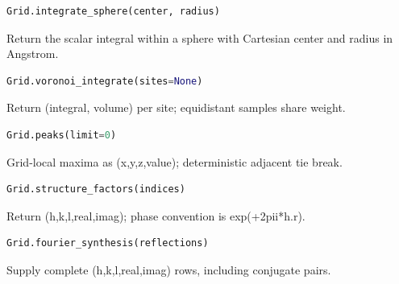 \begin{samepage}

\begin{lstlisting}[language=Python]
Grid.integrate_sphere(center, radius)
\end{lstlisting}

Return the scalar integral within a sphere with Cartesian center and radius in Angstrom.

\end{samepage}



\begin{samepage}

\begin{lstlisting}[language=Python]
Grid.voronoi_integrate(sites=None)
\end{lstlisting}

Return (integral, volume) per site; equidistant samples share weight.

\end{samepage}



\begin{samepage}

\begin{lstlisting}[language=Python]
Grid.peaks(limit=0)
\end{lstlisting}

Grid-local maxima as (x,y,z,value); deterministic adjacent tie break.

\end{samepage}



\begin{samepage}

\begin{lstlisting}[language=Python]
Grid.structure_factors(indices)
\end{lstlisting}

Return (h,k,l,real,imag); phase convention is exp(+2pii*h.r).

\end{samepage}



\begin{samepage}

\begin{lstlisting}[language=Python]
Grid.fourier_synthesis(reflections)
\end{lstlisting}

Supply complete (h,k,l,real,imag) rows, including conjugate pairs.

\end{samepage}



